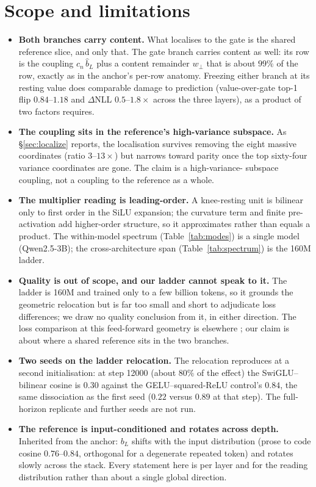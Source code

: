 \documentclass[11pt]{article}
\newcommand{\bl}{b_L}
\newcommand{\blh}{\hat{b}_L}
\begin{document}
\section{Scope and limitations}
\label{sec:scope}

\begin{itemize}
\item \textbf{Both branches carry content.} What localises to the gate is the
  shared reference slice, and only that. The gate branch carries content as well:
  its row is the coupling $c_n\,\blh$ plus a content remainder $w_\perp$ that is
  about $99\%$ of the row, exactly as in the anchor's per-row anatomy. Freezing
  either branch at its resting value does comparable damage to prediction
  (value-over-gate top-1 flip $0.84$--$1.18$ and $\Delta$NLL $0.5$--$1.8\times$
  across the three layers), as a product of two factors requires.
\item \textbf{The coupling sits in the reference's high-variance subspace.} As
  \S\ref{sec:localize} reports, the localisation survives removing the eight
  massive coordinates (ratio $3$--$13\times$) but narrows toward parity once the
  top sixty-four variance coordinates are gone. The claim is a high-variance-%
  subspace coupling, not a coupling to the reference as a whole.
\item \textbf{The multiplier reading is leading-order.} A knee-resting unit is
  bilinear only to first order in the SiLU expansion; the curvature term and
  finite pre-activation add higher-order structure, so it approximates rather than
  equals a product. The within-model spectrum (Table~\ref{tab:modes}) is a single
  model (Qwen2.5-3B); the cross-architecture span (Table~\ref{tab:spectrum}) is
  the 160M ladder.
\item \textbf{Quality is out of scope, and our ladder cannot speak to it.} The
  ladder is 160M and trained only to a few billion tokens, so it grounds the
  geometric relocation but is far too small and short to adjudicate loss
  differences; we draw no quality conclusion from it, in either direction. The
  loss comparison at this feed-forward geometry is elsewhere \citep{shazeer2020};
  our claim is about where a shared reference sits in the two branches.
\item \textbf{Two seeds on the ladder relocation.} The relocation reproduces at a
  second initialisation: at step 12000 (about $80\%$ of the effect) the
  SwiGLU--bilinear cosine is $0.30$ against the GELU--squared-ReLU control's
  $0.84$, the same dissociation as the first seed ($0.22$ versus $0.89$ at that
  step). The full-horizon replicate and further seeds are not run.
\item \textbf{The reference is input-conditioned and rotates across depth.}
  Inherited from the anchor: $\bl$ shifts with the input distribution (prose to
  code cosine $0.76$--$0.84$, orthogonal for a degenerate repeated token) and
  rotates slowly across the stack. Every statement here is per layer and for the
  reading distribution rather than about a single global direction.
\end{itemize}
\end{document}
